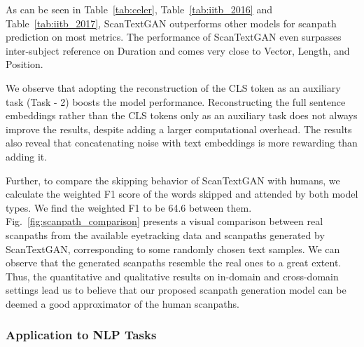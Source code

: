 As can be seen in Table~\ref{tab:celer}, Table~\ref{tab:iitb_2016} and Table~\ref{tab:iitb_2017}, ScanTextGAN outperforms other models for scanpath prediction on most metrics. The performance of ScanTextGAN even surpasses inter-subject reference on Duration and comes very close to Vector, Length, and Position. 

We observe that adopting the reconstruction of the CLS token as an auxiliary task (Task - 2) boosts the model performance. Reconstructing the full sentence embeddings rather than the CLS tokens only as an auxiliary task does not always improve the results, despite adding a larger computational overhead. The results also reveal that concatenating noise with text embeddings is more rewarding than adding it.

Further, to compare the skipping behavior of ScanTextGAN with humans, we calculate the weighted F1 score of the words skipped and attended by both model types. We find the weighted F1 to be 64.6 between them. Fig.~\ref{fig:scanpath_comparison} presents a visual comparison between real scanpaths from the available eyetracking data and scanpaths generated by ScanTextGAN, corresponding to some randomly chosen text samples. We can observe that the generated scanpaths resemble the real ones to a great extent. Thus, the quantitative and qualitative results on in-domain and cross-domain settings lead us to believe that our proposed scanpath generation model can be deemed a good approximator of the human scanpaths. %


\subsubsection{Application to NLP Tasks}
\label{sec:Application to NLP Tasks}

